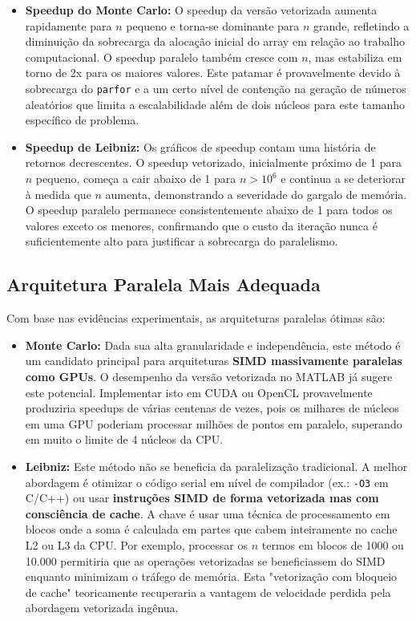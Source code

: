 \documentclass[12pt, a4paper]{article}
\begin{document}
	\begin{itemize}
		\item \textbf{Speedup do Monte Carlo:} O speedup da versão vetorizada
		aumenta rapidamente para \(n\) pequeno e torna-se dominante para \(n\)
		grande, refletindo a diminuição da sobrecarga da alocação inicial do array
		em relação ao trabalho computacional. O speedup paralelo também cresce com
		\(n\), mas estabiliza em torno de 2x para os maiores valores. Este patamar
		é provavelmente devido à sobrecarga do \texttt{parfor} e a um certo nível
		de contenção na geração de números aleatórios que limita a escalabilidade
		além de dois núcleos para este tamanho específico de problema.
		
		\item \textbf{Speedup de Leibniz:} Os gráficos de speedup contam uma
		história de retornos decrescentes. O speedup vetorizado, inicialmente
		próximo de 1 para \(n\) pequeno, começa a cair abaixo de 1 para
		\(n > 10^6\) e continua a se deteriorar à medida que \(n\) aumenta,
		demonstrando a severidade do gargalo de memória. O speedup paralelo
		permanece consistentemente abaixo de 1 para todos os valores exceto os
		menores, confirmando que o custo da iteração nunca é suficientemente alto
		para justificar a sobrecarga do paralelismo.
	\end{itemize}
	
	\subsection{Arquitetura Paralela Mais Adequada}
	
	Com base nas evidências experimentais, as arquiteturas paralelas ótimas são:
	
	\begin{itemize}
		\item \textbf{Monte Carlo:} Dada sua alta granularidade e independência,
		este método é um candidato principal para arquiteturas \textbf{SIMD
			massivamente paralelas como GPUs}. O desempenho da versão vetorizada no
		MATLAB já sugere este potencial. Implementar isto em CUDA ou OpenCL
		provavelmente produziria speedups de várias centenas de vezes, pois os
		milhares de núcleos em uma GPU poderiam processar milhões de pontos em
		paralelo, superando em muito o limite de 4 núcleos da CPU.
		
		\item \textbf{Leibniz:} Este método não se beneficia da paralelização
		tradicional. A melhor abordagem é otimizar o código serial em nível de
		compilador (ex.: \texttt{-O3} em C/C++) ou usar \textbf{instruções SIMD
			de forma vetorizada mas com consciência de cache}. A chave é usar uma
		técnica de processamento em blocos onde a soma é calculada em partes que
		cabem inteiramente no cache L2 ou L3 da CPU. Por exemplo, processar os
		\(n\) termos em blocos de 1000 ou 10.000 permitiria que as operações
		vetorizadas se beneficiassem do SIMD enquanto minimizam o tráfego de
		memória. Esta "vetorização com bloqueio de cache" teoricamente recuperaria
		a vantagem de velocidade perdida pela abordagem vetorizada ingênua.
	\end{itemize}
	
\end{document}
